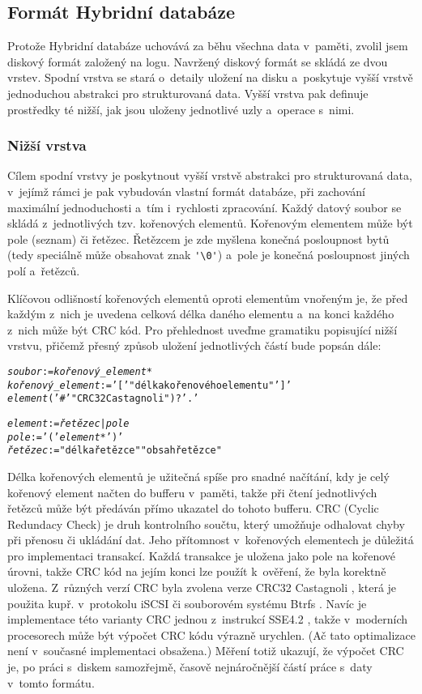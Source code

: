 \subsection{Formát Hybridní databáze}
Protože Hybridní databáze uchovává za běhu všechna data v~paměti, zvolil jsem
diskový formát založený na logu.
Navržený diskový formát se skládá ze dvou vrstev. Spodní vrstva se stará o~detaily
uložení na disku a~poskytuje vyšší vrstvě jednoduchou abstrakci pro strukturovaná data.
Vyšší vrstva pak definuje prostředky té nižší, jak jsou uloženy jednotlivé uzly
a~operace s~nimi.

\subsubsection*{Nižší vrstva}

Cílem spodní vrstvy je poskytnout vyšší vrstvě abstrakci pro strukturovaná
data, v~jejímž rámci je pak vybudován vlastní formát databáze, při zachování maximální
jednoduchosti a~tím i~rychlosti zpracování. Každý datový soubor se skládá z~jednotlivých
tzv. kořenových elementů. Kořenovým elementem může být pole (seznam) či řetězec.
Řetězcem je zde myšlena konečná posloupnost bytů (tedy speciálně může obsahovat znak
\verb|'\0'|) a~pole je konečná posloupnost jiných polí a~řetězců. 

Klíčovou odlišností
kořenových elementů oproti elementům vnořeným je, že před každým z~nich je uvedena
celková délka daného elementu a~na konci každého z~nich může být CRC kód.
Pro přehlednost uveďme gramatiku popisující nižší vrstvu, přičemž
přesný způsob uložení jednotlivých částí bude popsán dále:

\begin{alltt}
{\sl{}soubor} := {\sl{}kořenový\_element}*
{\sl{}kořenový\_element} := '[' "délka kořenového elementu" ']'
                    {\sl{}element} ( '#' "CRC32 Castagnoli" )? '.'

{\sl{}element} := {\sl{}řetězec} | {\sl{}pole}
{\sl{}pole}    := '(' {\sl{}element}* ')'
{\sl{}řetězec} := "délka řetězce" "obsah řetězce"
\end{alltt}


Délka kořenových elementů je užitečná spíše pro snadné načítání, kdy je celý kořenový
element načten do bufferu v~paměti, takže při čtení jednotlivých řetězců může být
předáván přímo ukazatel do tohoto bufferu. CRC (Cyclic Redundacy Check) je druh
kontrolního součtu, který umožňuje odhalovat chyby při přenosu
či ukládání dat. Jeho přítomnost v~kořenových elementech je důležitá pro
implementaci transakcí. Každá transakce je uložena jako pole na kořenové úrovni,
takže CRC kód na jejím konci lze použít k~ověření, že byla korektně uložena.
Z~různých verzí CRC byla zvolena verze CRC32 Castagnoli \cite{CRC32c},
která je použita
kupř. v~protokolu iSCSI \cite{iSCSI} či souborovém systému Btrfs \cite{btrfs}.
Navíc je implementace této varianty CRC jednou z~instrukcí
SSE4.2 \cite{sse42},
takže v~moderních procesorech může být výpočet CRC kódu výrazně urychlen.
(Ač tato optimalizace není v~současné implementaci obsažena.)
Měření totiž ukazují, že výpočet CRC je, po práci s~diskem samozřejmě, časově
nejnáročnější částí práce s~daty v~tomto formátu.

